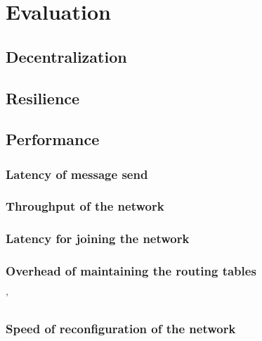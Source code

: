 \chapter{Evaluation}

\section{Decentralization}

\section{Resilience}

\section{Performance}

\subsection{Latency of message send}

\subsection{Throughput of the network}

\subsection{Latency for joining the network}

\subsection{Overhead of maintaining the routing tables}

'\subsection{Speed of reconfiguration of the network}
